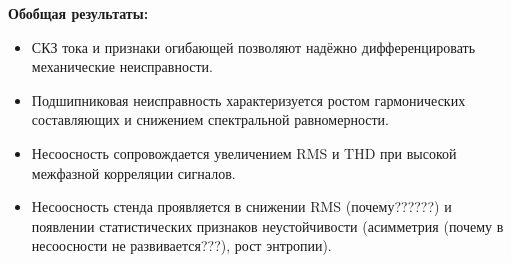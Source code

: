 \bigskip
\textbf{Обобщая результаты:}
\begin{itemize}
    \item СКЗ тока и признаки огибающей позволяют надёжно дифференцировать механические неисправности.
    \item Подшипниковая неисправность характеризуется ростом гармонических составляющих и снижением спектральной равномерности.
    \item Несоосность сопровождается увеличением RMS и THD при высокой межфазной корреляции сигналов.
    \item Несоосность стенда проявляется в снижении RMS (почему??????) и появлении статистических признаков неустойчивости (асимметрия (почему в несоосности не развивается???), рост энтропии).
\end{itemize}
